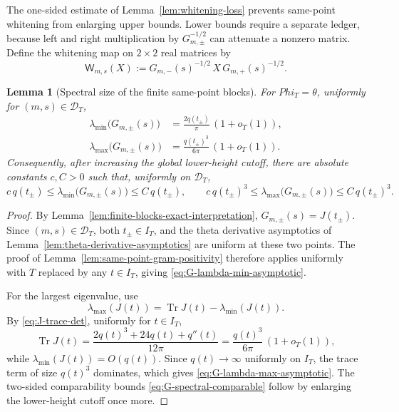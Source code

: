 \documentclass[11pt,a4paper]{amsart}
\def\Phi{Phi}%
\numberwithin{equation}{section}
\theoremstyle{plain}
\newtheorem{lemma}[theorem]{Lemma}
\theoremstyle{definition}
\newcommand{\Ph}{\Phi}
\newcommand{\Tr}{\operatorname{Tr}}
\begin{document}
The one-sided estimate of Lemma~\ref{lem:whitening-loss} prevents
same-point whitening from enlarging upper bounds.  Lower bounds require a
separate ledger, because left and right multiplication by
\(G_{m,\pm}^{-1/2}\) can attenuate a nonzero matrix.  Define the whitening
map on \(2\times2\) real matrices by
\begin{equation}
\label{eq:whitening-map}
        \mathsf W_{m,s}(X)
        :=G_{m,-}(s)^{-1/2}\,X\,G_{m,+}(s)^{-1/2}.
\end{equation}

\begin{lemma}[Spectral size of the finite same-point blocks]
\label{lem:finite-same-point-spectral-size}
For \(\Ph_T=\theta\), uniformly for \((m,s)\in\mathcal D_T\),
\begin{align}
\label{eq:G-lambda-min-asymptotic}
\lambda_{\min}\bigl(G_{m,\pm}(s)\bigr)
&=\frac{2q(t_\pm)}{\pi}\,(1+o_T(1)),\\
\label{eq:G-lambda-max-asymptotic}
\lambda_{\max}\bigl(G_{m,\pm}(s)\bigr)
&=\frac{q(t_\pm)^3}{6\pi}\,(1+o_T(1)).
\end{align}
Consequently, after increasing the global lower-height cutoff, there are
absolute constants \(c,C>0\) such that, uniformly on \(\mathcal D_T\),
\begin{equation}
\label{eq:G-spectral-comparable}
        c\,q(t_\pm)
        \le \lambda_{\min}\bigl(G_{m,\pm}(s)\bigr)
        \le C\,q(t_\pm),
        \qquad
        c\,q(t_\pm)^3
        \le \lambda_{\max}\bigl(G_{m,\pm}(s)\bigr)
        \le C\,q(t_\pm)^3.
\end{equation}
\end{lemma}

\begin{proof}
By Lemma~\ref{lem:finite-blocks-exact-interpretation},
\(G_{m,\pm}(s)=J(t_\pm)\).  Since \((m,s)\in\mathcal D_T\), both
\(t_\pm\in I_T\), and the theta derivative asymptotics of
Lemma~\ref{lem:theta-derivative-asymptotics} are uniform at these two
points.  The proof of Lemma~\ref{lem:same-point-gram-positivity} therefore
applies uniformly with \(T\) replaced by any \(t\in I_T\), giving
\eqref{eq:G-lambda-min-asymptotic}.

For the largest eigenvalue, use
\[
        \lambda_{\max}(J(t))
        =\Tr J(t)-\lambda_{\min}(J(t)).
\]
By \eqref{eq:J-trace-det}, uniformly for \(t\in I_T\),
\[
        \Tr J(t)
        =\frac{2q(t)^3+24q(t)+q''(t)}{12\pi}
        =\frac{q(t)^3}{6\pi}\,(1+o_T(1)),
\]
while \(\lambda_{\min}(J(t))=O(q(t))\).  Since \(q(t)\to\infty\)
uniformly on \(I_T\), the trace term of size \(q(t)^3\) dominates,
which gives \eqref{eq:G-lambda-max-asymptotic}.  The two-sided
comparability bounds \eqref{eq:G-spectral-comparable} follow by enlarging
the lower-height cutoff once more.
\end{proof}
\end{document}
